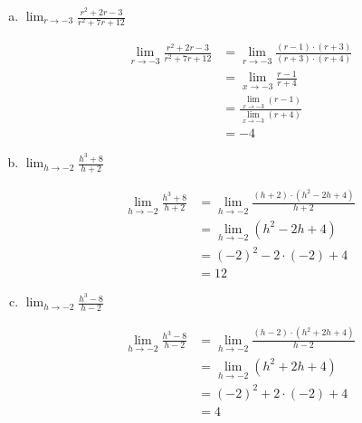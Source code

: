 \documentclass[a4paper, 12pt]{article}
\begin{document}
\begin{enumerate}
\begin{enumerate}[(a)]
        \item $\lim_{r \to -3} \frac{r^2 + 2r - 3}{r^2 + 7r + 12}$
        
        \begin{align*}
            \lim_{r \to -3} \frac{r^2 + 2r - 3}{r^2 + 7r + 12} &= \lim_{r \to -3} \frac{(r-1) \cdot (r+3)}{(r+3) \cdot (r+4)} \\
            &= \lim_{x \to -3} \frac{r-1}{r+4} \\
            &= \frac{\lim_{x \to -3}(r-1)}{\lim_{x \to -3}(r+4)} \\
            &= -4
        \end{align*}

        \item $\lim_{h \to -2} \frac{h^3 +8}{h+2}$
        
        \begin{align*}
            \lim_{h \to -2} \frac{h^3 +8}{h+2} &= \lim_{h \to -2} \frac{(h+2) \cdot (h^2 -2h +4)}{h+2} \\
            &= \lim_{h \to -2} (h^2 -2h +4) \\
            &= (-2)^2 - 2 \cdot (-2) + 4 \\
            &= 12
        \end{align*}

        \item $\lim_{h \to -2} \frac{h^3 -8}{h-2}$
        
        \begin{align*}
            \lim_{h \to -2} \frac{h^3 -8}{h-2} &= \lim_{h \to -2} \frac{(h-2) \cdot (h^2 +2h +4)}{h-2} \\
            &= \lim_{h \to -2} (h^2 +2h +4) \\
            &= (-2)^2 + 2 \cdot (-2) + 4 \\
            &= 4
        \end{align*}
        
    \end{enumerate}
\end{enumerate}
\end{document}
